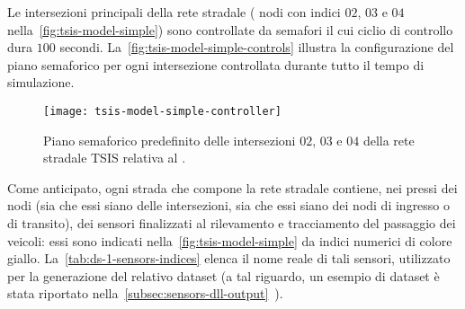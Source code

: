 Le intersezioni principali della rete stradale (\ie{} nodi con indici $02$, $03$ e $04$ nella~\vref{fig:tsis-model-simple}) sono controllate da semafori il cui ciclio di controllo dura $100$ secondi. La~\vref{fig:tsis-model-simple-controls} illustra la configurazione del piano semaforico per ogni intersezione controllata durante tutto il tempo di simulazione.
\begin{figure}[H]
	\centering
	\texttt{[image: tsis-model-simple-controller]}
	\caption[Piano semaforico relativo al ]{Piano semaforico predefinito delle intersezioni $02$, $03$ e $04$ della rete stradale \acs{TSIS} relativa al .}
	\label{fig:tsis-model-simple-controls}
\end{figure}

Come anticipato, ogni strada che compone la rete stradale contiene, nei pressi dei nodi (sia che essi siano delle intersezioni, sia che essi siano dei nodi di ingresso o di transito), dei sensori finalizzati al rilevamento e tracciamento del passaggio dei veicoli: essi sono indicati nella~\vref{fig:tsis-model-simple} da indici numerici di colore giallo. La~\vref{tab:ds-1-sensors-indices} elenca il nome reale di tali sensori, utilizzato per la generazione del relativo dataset (a tal riguardo, un esempio di dataset è stata riportato nella~\autoref{subsec:sensors-dll-output}~).
